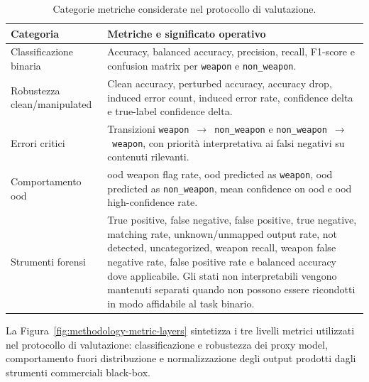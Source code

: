 \begin{table}[H]
\centering
\caption{Categorie metriche considerate nel protocollo di valutazione.}
\label{tab:methodology-evaluation-metrics}
\begin{tabularx}{\textwidth}{@{}lX@{}}
\toprule
\textbf{Categoria} & \textbf{Metriche e significato operativo} \\
\midrule
Classificazione binaria
&
Accuracy, balanced accuracy, precision, recall, F1-score e confusion matrix
per \texttt{weapon} e \texttt{non\_weapon}. \\
Robustezza clean/manipulated
&
Clean accuracy, perturbed accuracy, accuracy drop, induced error count,
induced error rate, confidence delta e true-label confidence delta. \\
Errori critici
&
Transizioni \texttt{weapon}~$\rightarrow$~\texttt{non\_weapon} e
\texttt{non\_weapon}~$\rightarrow$~\texttt{weapon}, con priorità interpretativa
ai falsi negativi su contenuti rilevanti. \\
Comportamento \gls{ood}
&
\gls{ood} weapon flag rate, \gls{ood} predicted as \texttt{weapon},
\gls{ood} predicted as \texttt{non\_weapon}, mean confidence on \gls{ood} e
\gls{ood} high-confidence rate. \\
Strumenti forensi
&
True positive, false negative, false positive, true negative, matching rate,
unknown/unmapped output rate, not detected, uncategorized, weapon recall,
weapon false negative rate, false positive rate e balanced accuracy dove
applicabile. Gli stati non interpretabili vengono mantenuti separati quando non
possono essere ricondotti in modo affidabile al task binario.\\
\bottomrule
\end{tabularx}
\end{table}


La Figura~\ref{fig:methodology-metric-layers} sintetizza i tre livelli metrici
utilizzati nel protocollo di valutazione: classificazione e robustezza dei proxy
model, comportamento fuori distribuzione e normalizzazione degli output prodotti
dagli strumenti commerciali black-box.

